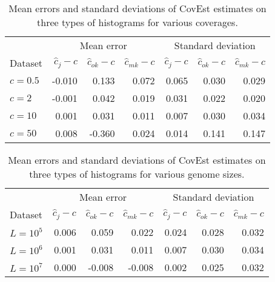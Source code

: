 \begin{table}[h]
\centering
\begin{tabular}{ l || r | r | r || r | r | r }
& \multicolumn{3}{|c||}{Mean error} & \multicolumn{3}{|c}{Standard deviation}\\  
Dataset & $\hat c_j - c$ & $\hat c_{ok} - c$ & $\hat c_{mk} - c$ & $\hat c_j - c$ & $\hat c_{ok} - c$ & $\hat c_{mk} - c$ \\
\hline \hline
$c=0.5$ & -0.010 & 0.133 & 0.072 & 0.065 & 0.030 & 0.029\\ \hline
$c=2$ & -0.001 & 0.042 & 0.019 & 0.031 & 0.022 & 0.020\\ \hline
$c=10$ & 0.001 & 0.031 & 0.011 & 0.007 & 0.030 & 0.034\\ \hline
$c=50$ & 0.008 & -0.360 & 0.024 & 0.014 & 0.141 & 0.147
\end{tabular}
\caption[CovEst estimates for different coverages]{Mean errors and standard deviations of CovEst estimates
on three types of histograms for various coverages.}
\label{tab:genome-parameters}
\end{table}

\begin{table}[h]
\centering
\begin{tabular}{ l || r | r | r || r | r | r }
& \multicolumn{3}{|c||}{Mean error} & \multicolumn{3}{|c}{Standard deviation}\\  
Dataset & $\hat c_j - c$ & $\hat c_{ok} - c$ & $\hat c_{mk} - c$ & $\hat c_j - c$ & $\hat c_{ok} - c$ & $\hat c_{mk} - c$ \\
\hline \hline
$L=10^5$ & 0.006 & 0.059 & 0.022 & 0.024 & 0.028 & 0.032\\ \hline
$L=10^6$ & 0.001 & 0.031 & 0.011 & 0.007 & 0.030 & 0.034\\ \hline
$L=10^7$ & 0.000 & -0.008 & -0.008 & 0.002 & 0.025 & 0.032
\end{tabular}
\caption[CovEst estimates for different genome sizes]{Mean errors and standard deviations of CovEst estimates
on three types of histograms for various genome sizes.}
\label{tab:genome-parameters}
\end{table}
